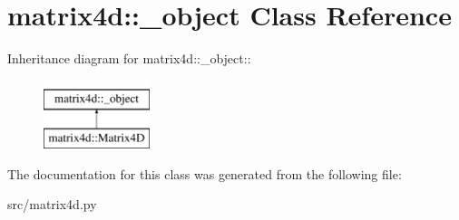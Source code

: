 \hypertarget{classmatrix4d_1_1__object}{
\section{matrix4d::\_\-object Class Reference}
\label{d5/df5/classmatrix4d_1_1__object}
}
Inheritance diagram for matrix4d::\_\-object::\begin{figure}[H]
\begin{center}
\leavevmode
\includegraphics[height=2cm]{d5/df5/classmatrix4d_1_1__object}
\end{center}
\end{figure}


The documentation for this class was generated from the following file:\begin{DoxyCompactItemize}
\item 
src/matrix4d.py\end{DoxyCompactItemize}

